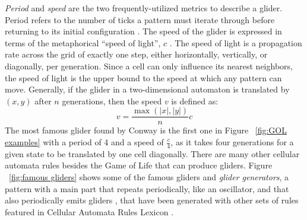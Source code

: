 \documentclass[12pt]{article}
\numberwithin{figure}{section} %
\begin{document}
\textit{Period} and \textit{speed} are the two frequently-utilized metrics to describe a glider. Period refers to the number of ticks a pattern must iterate through before returning to its initial configuration \cite{The Game of Life}. The speed of the glider is expressed in terms of the metaphorical “speed of light”, $c$ \cite{spaceship, speed of light}. The speed of light is a propagation rate across the grid of exactly one step, either horizontally, vertically, or diagonally, per generation. Since a cell can only influence its nearest neighbors, the speed of light is the upper bound to the speed at which any pattern can move. Generally, if the glider in a two-dimensional automaton is translated by $(x,y)$ after $n$ generations, then the speed $v$ is defined as: 
$$v = \frac{\max{(|x|, |y|)}}{n}c$$
The most famous glider found by Conway is the first one in Figure ~\ref{fig:GOL examples} with a period of 4 and a speed of $\frac{c}{4}$, as it takes four generations for a given state to be translated by one cell diagonally. There are many other cellular automata rules besides the Game of Life that can produce gliders. Figure ~\ref{fig:famous gliders} shows some of the famous gliders and \textit{glider generators}, a pattern with a main part that repeats periodically, like an oscillator, and that also periodically emits gliders \cite{gun}, that have been generated with other sets of rules featured in Cellular Automata Rules Lexicon \cite{Lexicon}. 
\end{document}
